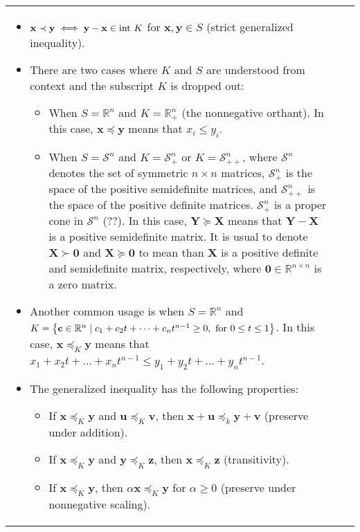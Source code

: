 \documentclass{article}
\begin{document}
\begin{table}[ht!]
\begin{tabularx}{\textwidth}{|A|B|C|}
\begin{itemize}[leftmargin=*]
    \item \(\mathbf{x} \prec \mathbf{y} \iff \mathbf{y} - \mathbf{x} \in \textnormal{int }K\) for \(\mathbf{x}, \mathbf{y} \in S\) (strict generalized inequality).
    \item There are two cases where \(K\) and \(S\) are understood from context and the subscript \(K\) is dropped out:
        \begin{itemize}[label={$\triangleright$}]
            \item When \(S = \mathbb{R}^{n}\) and \(K = \mathbb{R}^{n}_{+}\) (the nonnegative orthant). In this case, \(\mathbf{x} \preceq \mathbf{y}\) means that \(x_i \leq y_i\).
            \item When \(S = \mathcal{S}^{n}\) and \(K = \mathcal{S}^{n}_{+}\) or \(K = \mathcal{S}^{n}_{++}\), where \(\mathcal{S}^{n}\) denotes the set of symmetric \(n\times n\) matrices, \(\mathcal{S}^{n}_{+}\) is the space of the positive semidefinite matrices, and \(\mathcal{S}^{n}_{++}\) is the space of the positive definite matrices. \(\mathcal{S}^{n}_{+}\) is a proper cone in \(\mathcal{S}^{n}\) (??). In this case, \(\mathbf{Y} \succeq \mathbf{X}\) means that \(\mathbf{Y}-\mathbf{X}\) is a positive semidefinite matrix. It is usual to denote \(\mathbf{X} \succ \mathbf{0}\) and \(\mathbf{X} \succeq \mathbf{0}\) to mean than \(\mathbf{X}\) is a positive definite and semidefinite matrix, respectively, where \(\mathbf{0} \in \mathbb{R}^{n\times n}\) is a zero matrix.
        \end{itemize}
    \item Another common usage is when \(S = \mathbb{R}^{n}\) and \(K = \left\{ \mathbf{c} \in \mathbb{R}^{n} \mid c_1 + c_2 t + \dots + c_n t^{n-1} \geq 0, \textnormal{ for } 0\leq t\leq 1 \right\}\). In this case, \(\mathbf{x} \preceq_K \mathbf{y}\) means that \(x_1 + x_2 t + \dots + x_n t^{n-1} \leq y_1 + y_2 t + \dots + y_n t^{n-1}\).
    \item The generalized inequality has the following properties:
        \begin{itemize}[label={$\triangleright$}]
            \item If \(\mathbf{x} \preceq_K \mathbf{y}\) and \(\mathbf{u} \preceq_K \mathbf{v}\), then \(\mathbf{x} + \mathbf{u} \preceq_k \mathbf{y} + \mathbf{v}\) (preserve under addition).
            \item If \(\mathbf{x} \preceq_K \mathbf{y}\) and \(\mathbf{y} \preceq_K \mathbf{z}\), then \(\mathbf{x} \preceq_K \mathbf{z}\) (transitivity).
            \item If \(\mathbf{x}\preceq_K \mathbf{y}\), then \(\alpha\mathbf{x}\preceq_K \mathbf{y}\) for \(\alpha\geq0\) (preserve under nonnegative scaling).

\end{itemize}
\end{itemize}
\end{tabularx}
\end{table}
\end{document}
